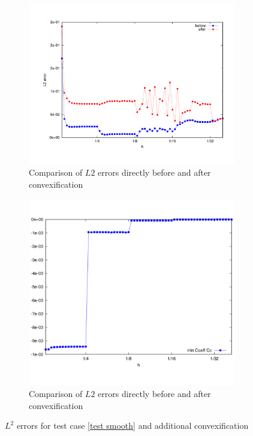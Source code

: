 \begin{figure}[H]
\centering
	\begin{subfigure}{0.45\textwidth}
		\includegraphics[scale=0.25]{plots/MA1_convexComp.pdf}
		\caption{Comparison of $L2$ errors directly before and after convexification}
		\label{fig: convex before after}
	\end{subfigure}
	\begin{subfigure}{0.45\textwidth}
		\includegraphics[scale=0.25]{plots/MA1_minCoeff.pdf}
		\caption{Comparison of $L2$ errors directly before and after convexification}
		\label{fig: convex min coeffs}
	\end{subfigure}	
	\caption{$L^2$ errors for test case \ref{test smooth} and additional convexification}
	\label{fig: Compare test smooth ourMethodConvex}
\end{figure}


